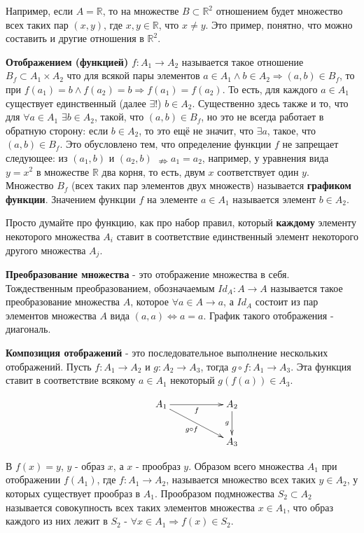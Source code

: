 \documentclass[a4paper]{book}
\begin{document}
Например, если $A = \mathbb{R}$, то на множестве $B \subset\mathbb{R}^2$ отношением будет множество всех таких пар $(x,y)$, где $x,y \in \mathbb{R}$, что $x\neq y$. Это пример, понятно, что можно составить и другие отношения в $\mathbb{R}^2$. 


\textbf{Отображением (функцией)} $f:A_1 \rightarrow A_2$ называется такое отношение $B_f \subset A_1 \times A_2$ что для всякой пары элементов $a \in A_1 \wedge b \in A_2 \Rightarrow (a,b) \in B_f$, то при $f(a_1) = b \wedge f(a_2) = b \Rightarrow f(a_1) = f(a_2)$. То есть, для каждого $a \in A_1$ существует единственный (далее $\exists!$) $b \in A_2$. Существенно здесь также и то, что для $\forall a\in A_1$ $\exists b \in A_2$, такой, что $(a,b) \in B_f$, но это не всегда работает в обратную сторону: если $b \in A_2$, то это ещё не значит, что $\exists a$, такое, что $(a,b)\in B_f$. Это обусловлено тем, что определение функции $f$ не запрещает следующее: из $(a_1,b)$ и $(a_2,b)$ $\nRightarrow a_1 = a_2$, например, у уравнения вида $y=x^2$ в множестве $\mathbb R$ два корня, то есть, двум $x$ соответствует один $y$. Множество $B_f$ (всех таких пар элементов двух множеств) называется \textbf{графиком функции}. Значением функции $f$ на элементе $a \in A_1$ называется элемент $b \in A_2$.

Просто думайте про функцию, как про набор правил, который \textbf{каждому} элементу некоторого множества $A_i$ ставит в соответствие единственный элемент некоторого другого множества $A_j$. 

\textbf{Преобразование множества} - это отображение множества в себя. Тождественным преобразованием, обозначаемым $Id_A: A\rightarrow A$ называется такое преобразование множества $A$, которое $\forall a\in A \rightarrow a$, а $Id_A$ состоит из пар элементов множества $A$ вида $(a,a) \Leftrightarrow a=a$. График такого отображения - диагональ. 

\textbf{Композиция отображений} - это последовательное выполнение нескольких отображений. Пусть $f: A_1 \rightarrow A_2$ и $g: A_2 \rightarrow A_3$, тогда $g\circ f: A_1 \rightarrow A_3$. Эта функция ставит в соответствие всякому $a\in A_1$ некоторый $g(f(a))\in A_3$.
 
\begin{equation}
{\xymatrix{
	& {A_1\ar[rr]_{f} \ar[drr]_{g\circ f}} && {A_2\ar[d]_{g}} 
	\\
	&&&{A_3} 
		 }}
\end{equation}

В $f(x)=y$, $y$ - образ $x$, а $x$ - прообраз $y$. Образом всего множества $A_1$ при отображении $f(A_1)$, где $f:A_1 \rightarrow A_2$, называется множество всех таких $y \in A_2$, у которых существует прообраз в $A_1$. Прообразом подмножества $S_2 \subset A_2$ называется совокупность всех таких элементов множества $x \in A_1$, что образ каждого из них лежит в $S_2$ - $\forall x\in A_1 \Rightarrow f(x)\in S_2$.
\end{document}
